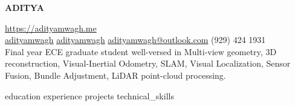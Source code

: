 \documentclass[a4paper]{article}
\begin{document}
\begin{center}
	\vspace*{-10pt}
	\begin{center}
		\uppercase{\Huge \bfseries Aditya }
	\end{center}
	\vspace{4pt}
	\href{https://adityamwagh.me}{https://adityamwagh.me} \\

	\vspace{4pt}
	\faLinkedin\space{} \href{https://linkedin.com/in/adityamwagh}{adityamwagh} \space{}
	\faGithub{} \space{} \href{https://github.com/adityamwagh}{adityamwagh} \space{}
	\faAt{} \space{} \href{mailto:adityamwagh@outlook.com}{adityamwagh@outlook.com} \space{}
	\faPhone{} \space{} (929) 424 1931 \\

	\vspace{4pt}
	Final year ECE graduate student well-versed in Multi-view geometry, 3D reconstruction,
	Visual-Inertial Odometry, SLAM, Visual Localization, Sensor Fusion, Bundle Adjustment, LiDAR point-cloud processing.
\end{center}

\justifying{}
{education}
{experience}
{projects}
{technical_skills}

\end{document}
